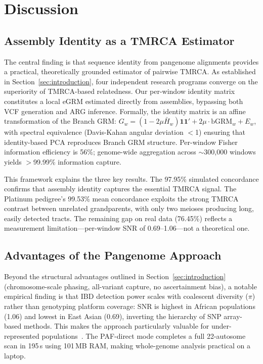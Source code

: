 \section{Discussion}
\label{sec:discussion}

\subsection{Assembly Identity as a TMRCA Estimator}

The central finding is that sequence identity from pangenome alignments provides a practical, theoretically grounded estimator of pairwise TMRCA. As established in Section~\ref{sec:introduction}, four independent research programs converge on the superiority of TMRCA-based relatedness. Our per-window identity matrix constitutes a local eGRM estimated directly from assemblies, bypassing both VCF generation and ARG inference. Formally, the identity matrix is an affine transformation of the Branch GRM: $G_w = (1-2\mu\bar{H}_w)\mathbf{11}' + 2\mu\cdot\text{bGRM}_w + E_w$, with spectral equivalence (Davis-Kahan angular deviation $<$1\textdegree) ensuring that identity-based PCA reproduces Branch GRM structure. Per-window Fisher information efficiency is 56\%; genome-wide aggregation across $\sim$300{,}000 windows yields $>$99.99\% information capture.

This framework explains the three key results. The 97.95\% simulated concordance confirms that assembly identity captures the essential TMRCA signal. The Platinum pedigree's 99.53\% mean concordance exploits the strong TMRCA contrast between unrelated grandparents, with only two meioses producing long, easily detected tracts. The remaining gap on real data (76.45\%) reflects a measurement limitation---per-window SNR of 0.69--1.06---not a theoretical one.

\subsection{Advantages of the Pangenome Approach}

Beyond the structural advantages outlined in Section~\ref{sec:introduction} (chromosome-scale phasing, all-variant capture, no ascertainment bias), a notable empirical finding is that IBD detection power scales with coalescent diversity ($\pi$) rather than genotyping platform coverage: SNR is highest in African populations (1.06) and lowest in East Asian (0.69), inverting the hierarchy of SNP array-based methods. This makes the approach particularly valuable for under-represented populations~\cite{lachance2012ascertainment}. The PAF-direct mode completes a full 22-autosome scan in 195\,s using 101\,MB RAM, making whole-genome analysis practical on a laptop.

